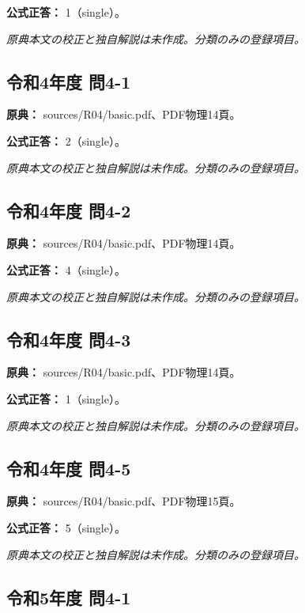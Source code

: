 \textbf{公式正答：} 1（single）。

\par\textit{原典本文の校正と独自解説は未作成。分類のみの登録項目。}

\subsection{令和4年度 問4-1}
\label{q:r04-reg-basic-4-1}

\noindent\textbf{原典：} sources/R04/basic.pdf、PDF物理14頁。

\textbf{公式正答：} 2（single）。

\par\textit{原典本文の校正と独自解説は未作成。分類のみの登録項目。}

\subsection{令和4年度 問4-2}
\label{q:r04-reg-basic-4-2}

\noindent\textbf{原典：} sources/R04/basic.pdf、PDF物理14頁。

\textbf{公式正答：} 4（single）。

\par\textit{原典本文の校正と独自解説は未作成。分類のみの登録項目。}

\subsection{令和4年度 問4-3}
\label{q:r04-reg-basic-4-3}

\noindent\textbf{原典：} sources/R04/basic.pdf、PDF物理14頁。

\textbf{公式正答：} 1（single）。

\par\textit{原典本文の校正と独自解説は未作成。分類のみの登録項目。}

\subsection{令和4年度 問4-5}
\label{q:r04-reg-basic-4-5}

\noindent\textbf{原典：} sources/R04/basic.pdf、PDF物理15頁。

\textbf{公式正答：} 5（single）。

\par\textit{原典本文の校正と独自解説は未作成。分類のみの登録項目。}

\subsection{令和5年度 問4-1}
\label{q:r05-reg-basic-4-1}

